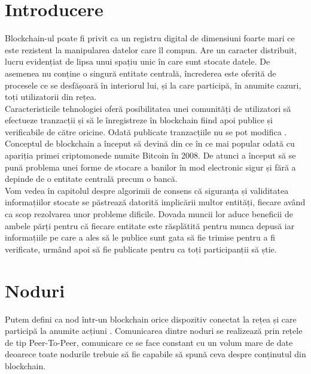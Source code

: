 
\section{Introducere}
\hfill

Blockchain-ul poate fi privit ca un registru digital de dimensiuni foarte mari ce este rezistent la manipularea datelor care îl compun. Are un caracter distribuit, lucru evidențiat de lipsa unui spațiu unic în care sunt stocate datele. De asemenea nu conține o singură entitate centrală, încrederea este oferită de procesele ce se desfășoară în interiorul lui, și la care participă, în anumite cazuri, toți utilizatorii din rețea.\\

Caracteristicile tehnologiei oferă posibilitatea unei comunități de utilizatori să efectueze tranzacții și să le înregistreze în blockchain fiind apoi publice și verificabile de către oricine. Odată publicate tranzacțiile nu se pot modifica \cite{Blockchain_Overview_NIST}.\\

Conceptul de blockchain a început să devină din ce în ce mai popular odată cu apariția primei criptomonede numite Bitcoin în 2008. De atunci a început să se pună problema unei forme de stocare a banilor în mod electronic sigur și fără a depinde de o entitate centrală precum o bancă.\\

Vom vedea în capitolul despre algorimii de consens că siguranța și validitatea informațiilor stocate se păstrează datorită implicării multor entități, fiecare având ca scop rezolvarea unor probleme dificile. Dovada muncii lor aduce beneficii de ambele părți pentru că fiecare entitate este răsplătită pentru munca depusă iar informațiile pe care a ales să le publice sunt gata să fie trimise pentru a fi verificate, urmând apoi să fie publicate pentru ca toți participanții să știe.\\

\hfill

\section{Noduri}
\hfill

Putem defini ca nod într-un blockchain orice dispozitiv conectat la rețea și care participă la anumite acțiuni \cite{Blockchain_Node_Types}. Comunicarea dintre noduri se realizează prin rețele de tip Peer-To-Peer, comunicare ce se face constant cu un volum mare de date deoarece toate nodurile trebuie să fie capabile să spună ceva despre conținutul din blockchain.\\

